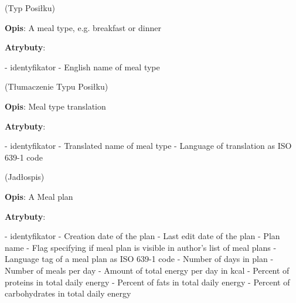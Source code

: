 \begin{enumerate}[label={\textbf{KAT/\protect\threedigits{\theenumi}}}, wide, labelwidth=!, labelindent=0pt, labelsep=0pt, series=reqs]
     \label{kat:MealType} (Typ Posiłku)

    \textbf{Opis}: A meal type, e.g. breakfast or dinner
    \par
    \textbf{Atrybuty}:
    \begin{itemize}[series=atr, wide, align=left, leftmargin=190pt]
         \label{kat:MealType:id} - identyfikator
         \label{kat:MealType:name} - English name of meal type
    \end{itemize}

     \label{kat:MealTypeTranslation} (Tłumaczenie Typu Posiłku)

    \textbf{Opis}: Meal type translation
    \par
    \textbf{Atrybuty}:
    \begin{itemize}[series=atr, wide, align=left, leftmargin=190pt]
         \label{kat:MealTypeTranslation:id} - identyfikator
         \label{kat:MealTypeTranslation:translation} - Translated name of meal type
         \label{kat:MealTypeTranslation:language} - Language of translation as ISO 639-1 code
    \end{itemize}


     \label{kat:MealPlan} (Jadłospis)

    \textbf{Opis}: A Meal plan
    \par
    \textbf{Atrybuty}:
    \begin{itemize}[series=atr, wide, align=left, leftmargin=190pt]
         \label{kat:MealPlan:id} - identyfikator
         \label{kat:MealPlan:creationTimestamp} - Creation date of the plan
         \label{kat:MealPlan:editTimestamp} - Last edit date of the plan
         \label{kat:MealPlan:name} - Plan name
         \label{kat:MealPlan:isVisible} - Flag specifying if meal plan is visible in author's list of meal plans
         \label{kat:MealPlan:language} - Language tag of a meal plan as ISO 639-1 code
         \label{kat:MealPlan:numberOfDays} - Number of days in plan
         \label{kat:MealPlan:numberOfMealsPerDay} - Number of meals per day
         \label{kat:MealPlan:totalDailyEnergy} - Amount of total energy per day in kcal
         \label{kat:MealPlan:percentOfProtein} - Percent of proteins in total daily energy
         \label{kat:MealPlan:percentOfFat} - Percent of fats in total daily energy
         \label{kat:MealPlan:percentOfCarbohydrates} - Percent of carbohydrates in total daily energy
    \end{itemize}


\end{enumerate}
